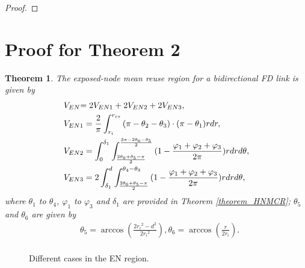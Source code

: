 \documentclass[conference]{IEEEtran}
\theoremstyle{plain}
\newtheorem{theorem}{Theorem}
\begin{document}
\begin{appendices}
\begin{proof}
\end{proof}	


\section{Proof for Theorem 2} 

\begin{theorem}\label{theorem_ENMRR}
	The exposed-node mean reuse region for a bidirectional FD link is given by
	\begin{align}
	\label{V_EN_total} &{V_{EN}}{\rm{ = 2}}{V_{EN1}} + {\rm{2}}{V_{EN2}}+ {\rm{2}}{V_{EN3}},\\
	\label{V_EN1} &{V_{EN1}} = \frac{2}{\pi }\int_{{r_i}}^{r_{cs}} {(\pi  - {\theta _2} - {\theta _3})}  \cdot (\pi  - {\theta _1})rdr, \\
	\label{V_EN2} &{V_{EN2}} = \int_0^{{\delta _1}} {\int_{\frac{{2{\theta _6} + {\theta _5} - \pi }}{2}}^{\frac{{3\pi  - 2{\theta _6} - {\theta _5}}}{2}} {(1 - \frac{{{\varphi _1} + {\varphi _2} + {\varphi _3}}}{{2\pi }})} } rdrd\theta, \\
	\label{V_EN3} &{V_{EN3}} = 2\int_{{\delta _1}}^d {\int_{\frac{{2{\theta _6} + {\theta _5} - \pi }}{2}}^{{\theta _4} - {\theta _3}} {(1 - \frac{{{\varphi _1} + {\varphi _2} + {\varphi _3}}}{{2\pi }})} } rdrd\theta,
	\end{align}
	where $\theta_1$ to $\theta_4$, $\varphi _1$ to $\varphi _3$ and $\delta _1$ are provided in Theorem \ref{theorem_HNMCR}; $\theta_5$ and $\theta_6$ are given by
	\begin{align*}
	&{\theta _5} = \arccos (\frac{{2{r_i}^2 - {d^2}}}{{2{r_i}^2}}), {\theta _6} = \arccos (\frac{r}{{2{r_i}}}). \\
	\end{align*}
\end{theorem} 

\begin{figure}[htbp] 
\centering   
{}



\caption{Different cases in the EN region.}
\label{proof_MRR}
\end{figure}



\end{appendices}
\end{document}
